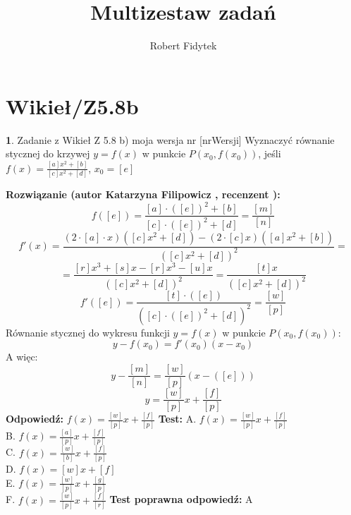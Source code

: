 \documentclass[12pt, a4paper]{article}
\title{Multizestaw zadań}
\author{Robert Fidytek}
\date{}
\theoremstyle{definition} %
\newtheorem{zad}{}
\newcommand{\kategoria}[1]{\section{#1}} %
\newcommand{\zadStart}[1]{\begin{zad}#1\newline} %
\newcommand{\zadStop}{\end{zad}}   %
\newcommand{\rozwStart}[2]{\noindent \textbf{Rozwiązanie (autor #1 , recenzent #2): }\newline} %
\newcommand{\rozwStop}{\newline}                                            %
\newcommand{\odpStart}{\noindent \textbf{Odpowiedź:}\newline}    %
\newcommand{\odpStop}{\newline}                                             %
\newcommand{\testStart}{\noindent \textbf{Test:}\newline} %
\newcommand{\testStop}{\newline} %
\newcommand{\kluczStart}{\noindent \textbf{Test poprawna odpowiedź:}\newline} %
\newcommand{\kluczStop}{\newline} %
\begin{document}
\maketitle


\kategoria{Wikieł/Z5.8b}
\zadStart{Zadanie z Wikieł Z 5.8 b) moja wersja nr [nrWersji]}
Wyznaczyć równanie stycznej do krzywej $y=f(x)$ w punkcie $P(x_0,f(x_0))$, jeśli\\
$f(x)=\frac{[a]x^2+[b]}{[c]x^2+[d]}$, $x_0=[e]$
\zadStop
\rozwStart{Katarzyna Filipowicz}{}
$$
f([e])=\frac{[a]\cdot([e])^2+[b]}{[c]\cdot([e])^2+[d]}=\frac{[m]}{[n]}
$$ $$
f'(x)=\frac{(2\cdot[a]\cdot x)([c]x^2+[d])-(2\cdot [c]x)([a]x^2+[b])}{([c]x^2+[d])^2}=
$$ $$
=\frac{[r]x^3+[s]x-[r]x^3-[u]x}{([c]x^2+[d])^2}=\frac{[t]x}{([c]x^2+[d])^2}
$$ $$
f'([e])=\frac{[t]\cdot([e])}{([c]\cdot([e])^2+[d])^2}=\frac{[w]}{[p]}
$$
Równanie stycznej do wykresu funkcji $y=f(x)$ w punkcie $P(x_0,f(x_0))$:
$$
y-f(x_0)=f'(x_0)(x-x_0)
$$
A więc:
$$
y-\frac{[m]}{[n]}=\frac{[w]}{[p]}\left(x-([e])\right)
$$ $$
y=\frac{[w]}{[p]} x+\frac{[f]}{[p]}
$$
\rozwStop
\odpStart
$f(x)=\frac{[w]}{[p]} x+\frac{[f]}{[p]}$
\odpStop
\testStart
A. $ f(x)=\frac{[w]}{[p]} x+\frac{[f]}{[p]}$\\
B. $ f(x)=\frac{[a]}{[p]} x+\frac{[f]}{[p]}$\\
C. $ f(x)=\frac{[w]}{[b]} x+\frac{[f]}{[p]}$ \\
D. $ f(x)=[w] x+[f]$\\
E. $ f(x)=\frac{[w]}{[p]} x+\frac{[g]}{[p]}$\\
F. $ f(x)=\frac{[w]}{[p]} x+\frac{[f]}{[r]}$
\testStop
\kluczStart
A
\kluczStop
\end{document}
